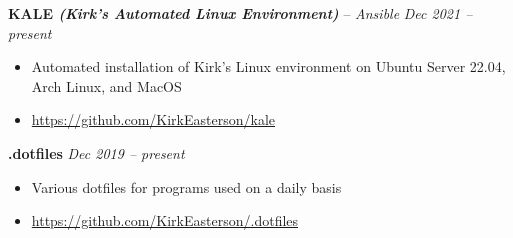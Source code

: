 \documentclass[10pt,letterpaper]{article}
\begin{document}
\spacedhrule{0.3em}{-0.5em}











\headedsection
{\textbf{KALE \textit{(Kirk's Automated Linux Environment)}} -- \textit{Ansible}}
{\textit{Dec 2021 -- present}} {
	\begin{itemize}[noitemsep,nolistsep]
		\item Automated installation of Kirk's Linux environment on Ubuntu Server 22.04, Arch Linux, and MacOS
		\item \url{https://github.com/KirkEasterson/kale}
	\end{itemize}
}


\headedsection
{\textbf{.dotfiles}}
{\textit{Dec 2019 -- present}} {
	\begin{itemize}[noitemsep,nolistsep]
		\item Various dotfiles for programs used on a daily basis
		\item \url{https://github.com/KirkEasterson/.dotfiles}
	\end{itemize}
}

\end{document}
